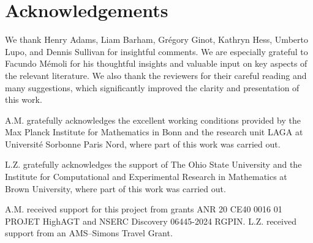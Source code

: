 
\section*{Acknowledgements}

We thank Henry Adams, Liam Barham, Gr\'egory Ginot, Kathryn Hess, Umberto Lupo, and Dennis Sullivan for insightful comments.
We are especially grateful to Facundo M\'{e}moli for his thoughtful insights and valuable input on key aspects of the relevant literature.
We also thank the reviewers for their careful reading and many suggestions, which significantly improved the clarity and presentation of this work.

A.M. gratefully acknowledges the excellent working conditions provided by the Max Planck Institute for Mathematics in Bonn and the research unit LAGA at Université Sorbonne Paris Nord, where part of this work was carried out.

L.Z. gratefully acknowledges the support of The Ohio State University and the Institute for Computational and Experimental Research in Mathematics at Brown University, where part of this work was carried out.

A.M. received support for this project from grants ANR 20 CE40 0016 01 PROJET HighAGT and NSERC Discovery 06445-2024 RGPIN.
L.Z. received support from an AMS--Simons Travel Grant.
